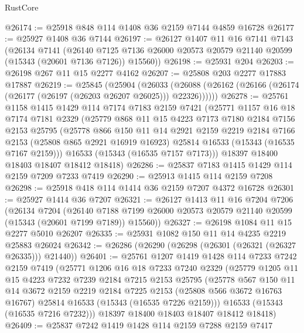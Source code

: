 \begin{lexlean}{RustCore}
\begin{coremodule}
@26174 := @25918 @848 @114 @1408 @36 @2159 @7144 @4859 @16728
@26177 := @25927 @1408 @36 @7144
@26197 := @26127
    @1407
    @11
    @16
    @7141
    @7143
    (@26134
      @7141
      (@26140 @7125 @7136 @26000 @20573 @20579 @21140 @20599 (@15343 (@20601 @7136 @7126)) @15560))
@26198 := @25931 @204
@26203 := @26198 @267 @11 @15 @2277 @4162
@26207 := @25808 @203 @2277 @17883 @17887
@26219 := @25845
    (@25904
      (@26033 (@26088 (@26162 (@26166 (@26174 (@26177 (@26197 (@26203 @26207 @26025))) @22326))))))
@26278 := @25761
    @1158
    @1415
    @1429
    @114
    @7174
    @7183
    @2159
    @7421
    (@25771
      @1157
      @16
      @18
      @7174
      @7181
      @2329
      (@25779
        @868
        @11
        @15
        @4223
        @7173
        @7180
        @2184
        @7156
        @2153
        @25795
        (@25778
          @866
          @150
          @11
          @14
          @2921
          @2159
          @2219
          @2184
          @7166
          @2153
          (@25808 @865 @2921 @16919 @16923)
          @25814
          @16533
          (@15343 (@16535 @7167 @2159)))
        @16533
        (@15343 (@16535 @7157 @7173)))
      @18397
      @18400
      @18403
      @18407
      @18412
      @18418)
@26286 := @25837 @7183 @1415 @1429 @114 @2159 @7209 @7233 @7419
@26290 := @25913 @1415 @114 @2159 @7208
@26298 := @25918 @418 @114 @1414 @36 @2159 @7207 @4372 @16728
@26301 := @25927 @1414 @36 @7207
@26321 := @26127
    @1413
    @11
    @16
    @7204
    @7206
    (@26134
      @7204
      (@26140 @7188 @7199 @26000 @20573 @20579 @21140 @20599 (@15343 (@20601 @7199 @7189)) @15560))
@26327 := @26198 @1084 @11 @15 @2277 @5010 @26207
@26335 := @25931 @1082 @150 @11 @14 @4235 @2219 @25883 @26024
@26342 := @26286 (@26290 (@26298 (@26301 (@26321 (@26327 @26335))) @21440))
@26401 := @25761
    @1207
    @1419
    @1428
    @114
    @7233
    @7242
    @2159
    @7419
    (@25771
      @1206
      @16
      @18
      @7233
      @7240
      @2329
      (@25779
        @1205
        @11
        @15
        @4223
        @7232
        @7239
        @2184
        @7215
        @2153
        @25795
        (@25778
          @567
          @150
          @11
          @14
          @3672
          @2159
          @2219
          @2184
          @7225
          @2153
          (@25808 @566 @3672 @16763 @16767)
          @25814
          @16533
          (@15343 (@16535 @7226 @2159)))
        @16533
        (@15343 (@16535 @7216 @7232)))
      @18397
      @18400
      @18403
      @18407
      @18412
      @18418)
@26409 := @25837 @7242 @1419 @1428 @114 @2159 @7288 @2159 @7417

\end{coremodule}
\end{lexlean}
